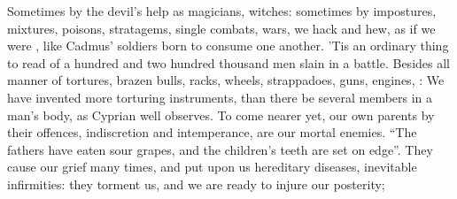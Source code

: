 Sometimes by the devil's help as magicians, witches:
sometimes by impostures, mixtures, poisons, stratagems, single combats, wars,
we hack and hew, as if we were , like Cadmus'
soldiers born to consume one another. 'Tis an ordinary thing to read of a
hundred and two hundred thousand men slain in a battle. Besides all manner of
tortures, brazen bulls, racks, wheels, strappadoes, guns, engines, \etc{}
:
We have invented more torturing instruments, than there be several members in a
man's body, as Cyprian well observes. To come nearer yet, our own parents by
their offences, indiscretion and intemperance, are our mortal enemies.
\enquote{The fathers have eaten sour grapes, and the children's
teeth are set on edge}. They cause our grief many times, and put upon us
hereditary diseases, inevitable infirmities: they torment us, and we are ready
to injure our posterity;


